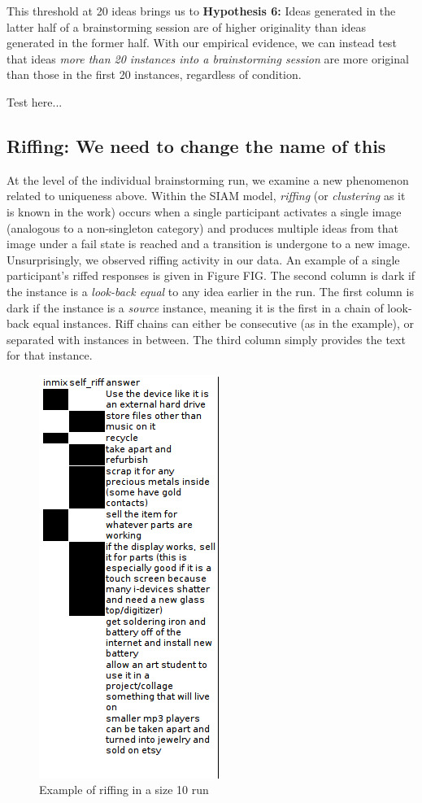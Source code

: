 This threshold at 20 ideas brings us to \textbf{Hypothesis 6:} Ideas generated in the latter half of a brainstorming session are of higher originality than ideas generated in the former half. With our empirical evidence, we can instead test that ideas \emph{more than 20 instances into a brainstorming session} are more original than those in the first 20 instances, regardless of condition.

Test here...

\subsection{Riffing: We need to change the name of this}

At the level of the individual brainstorming run, we examine a new phenomenon related to uniqueness above. Within the SIAM model, \emph{riffing} (or \emph{clustering} as it is known in the work) occurs when a single participant activates a single image (analogous to a non-singleton category) and produces multiple ideas from that image under a fail state is reached and a transition is undergone to a new image. Unsurprisingly, we observed riffing activity in our data. An example of a single participant's riffed responses is given in Figure FIG. The second column is dark if the instance is a \emph{look-back equal} to any idea earlier in the run. The first column is dark if the instance is a \emph{source} instance, meaning it is the first in a chain of look-back equal instances. Riff chains can either be consecutive (as in the example), or separated with instances in between. The third column simply provides the text for that instance.

\begin{figure}[h]
    \centering
    \includegraphics[width=0.5\columnwidth]{10_riff}
    \caption{Example of riffing in a size 10 run}
\end{figure}

